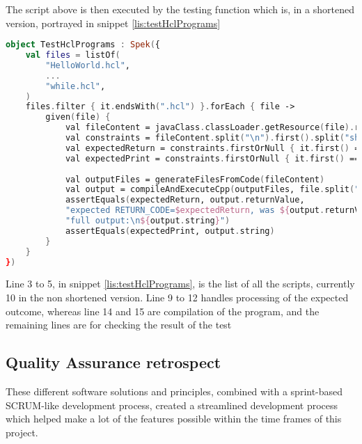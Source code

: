 The script above is then executed by the testing function which is, in a shortened version, portrayed in snippet \ref{lis:testHclPrograms}
\begin{lstlisting}[language=Kotlin,label={lis:testHclPrograms},caption={Shortened version of the test for system tests}]
object TestHclPrograms : Spek({
	val files = listOf(
		"HelloWorld.hcl",
		...
		"while.hcl",
	)
	files.filter { it.endsWith(".hcl") }.forEach { file ->
		given(file) {
			val fileContent = javaClass.classLoader.getResource(file).readText()
			val constraints = fileContent.split("\n").first().split("should 		").drop(1).map { it.split(" ") }
			val expectedReturn = constraints.firstOrNull { it.first() == "return" }?.get(1)?.toInt() ?: 0
			val expectedPrint = constraints.firstOrNull { it.first() == "print" }?.drop(1)?.joinToString(" ") ?: " "
			
			val outputFiles = generateFilesFromCode(fileContent)
			val output = compileAndExecuteCpp(outputFiles, file.split(".").first(), keepFiles)!!
			assertEquals(expectedReturn, output.returnValue,
			"expected RETURN_CODE=$expectedReturn, was ${output.returnValue}\n" +
			"full output:\n${output.string}")
			assertEquals(expectedPrint, output.string)	
		}
	}
})
\end{lstlisting}

Line 3 to 5, in snippet \ref{lis:testHclPrograms}, is the list of all the scripts, currently 10 in the non shortened version. 
Line 9 to 12 handles processing of the expected outcome, whereas line 14 and 15 are compilation of the program, and the remaining lines are for checking the result of the test

\subsection{Quality Assurance retrospect}

These different software solutions and principles, combined with a sprint-based SCRUM-like development process, created a streamlined development process which helped make a lot of the features possible within the time frames of this project.